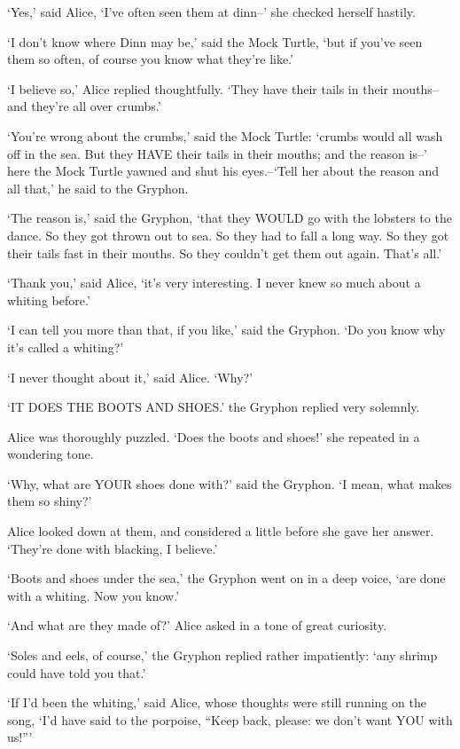 \documentclass[12pt]{book}
\begin{document}
  `Yes,' said Alice, `I've often seen them at dinn--' she
checked herself hastily.

  `I don't know where Dinn may be,' said the Mock Turtle, `but
if you've seen them so often, of course you know what they're
like.'

  `I believe so,' Alice replied thoughtfully.  `They have their
tails in their mouths--and they're all over crumbs.'

  `You're wrong about the crumbs,' said the Mock Turtle:
`crumbs would all wash off in the sea.  But they HAVE their tails
in their mouths; and the reason is--' here the Mock Turtle
yawned and shut his eyes.--`Tell her about the reason and all
that,' he said to the Gryphon.

  `The reason is,' said the Gryphon, `that they WOULD go with
the lobsters to the dance.  So they got thrown out to sea.  So
they had to fall a long way.  So they got their tails fast in
their mouths.  So they couldn't get them out again.  That's all.'

  `Thank you,' said Alice, `it's very interesting.  I never knew
so much about a whiting before.'

  `I can tell you more than that, if you like,' said the
Gryphon.  `Do you know why it's called a whiting?'

  `I never thought about it,' said Alice.  `Why?'

  `IT DOES THE BOOTS AND SHOES.' the Gryphon replied very
solemnly.

  Alice was thoroughly puzzled.  `Does the boots and shoes!' she
repeated in a wondering tone.

  `Why, what are YOUR shoes done with?' said the Gryphon.  `I
mean, what makes them so shiny?'

  Alice looked down at them, and considered a little before she
gave her answer.  `They're done with blacking, I believe.'

  `Boots and shoes under the sea,' the Gryphon went on in a deep
voice, `are done with a whiting.  Now you know.'

  `And what are they made of?' Alice asked in a tone of great
curiosity.

  `Soles and eels, of course,' the Gryphon replied rather
impatiently:  `any shrimp could have told you that.'

  `If I'd been the whiting,' said Alice, whose thoughts were
still running on the song, `I'd have said to the porpoise, ``Keep
back, please:  we don't want YOU with us!'''
\end{document}
